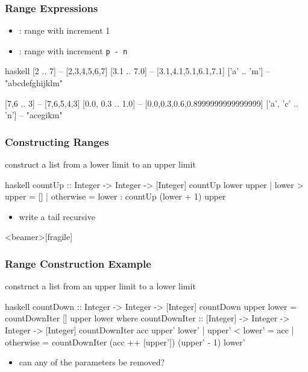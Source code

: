 \documentclass[dvipsnames]{beamer}
\theoremstyle{plain}
\begin{document}
\begin{frame}[fragile]
  \frametitle{Range Expressions}

  \begin{itemize}
    \item {}: range with increment 1
    \item {}: range with increment \texttt{p - n}
  \end{itemize}

  \begin{exampleblock}{}
    \begin{pygments}{haskell}
[2 .. 7]           -- [2,3,4,5,6,7]
[3.1 .. 7.0]       -- [3.1,4.1,5.1,6.1,7.1]
['a' .. 'm']       -- "abcdefghijklm"

[7,6 .. 3]         -- [7,6,5,4,3]
[0.0, 0.3 .. 1.0]  -- [0.0,0.3,0.6,0.8999999999999999]
['a', 'c' .. 'n']  -- "acegikm"
    \end{pygments}
  \end{exampleblock}
\end{frame}

\begin{frame}[fragile]
  \frametitle{Constructing Ranges}

  \begin{exampleblock}{construct a list from a lower limit to an upper limit}
    \begin{pygments}{haskell}
countUp :: Integer -> Integer -> [Integer]
countUp lower upper
  | lower > upper = []
  | otherwise     = lower : countUp (lower + 1) upper
    \end{pygments}
  \end{exampleblock}

  \pause
  \begin{itemize}
    \item write a tail recursive 
  \end{itemize}
\end{frame}

\begin{frame}<beamer>[fragile]
  \frametitle{Range Construction Example}

  \begin{footnotesize}
    \begin{exampleblock}{construct a list from an upper limit to a lower limit}
      \begin{pygments}{haskell}
countDown :: Integer -> Integer -> [Integer]
countDown upper lower = countDownIter [] upper lower
  where
    countDownIter :: [Integer] -> Integer -> Integer -> [Integer]
    countDownIter acc upper' lower'
      | upper' < lower' = acc
      | otherwise       = countDownIter (acc ++ [upper'])
                                        (upper' - 1) lower'
    \end{pygments}
    \end{exampleblock}
  \end{footnotesize}

  \pause
  \begin{itemize}
    \item can any of the parameters be removed?
  \end{itemize}
\end{frame}
\end{document}
